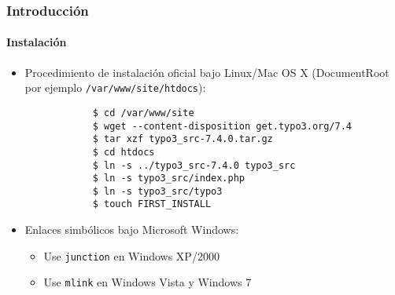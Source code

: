 \begin{frame}[fragile]
	\frametitle{Introducción}
	\framesubtitle{Instalación}

	\begin{itemize}
		\item Procedimiento de instalación oficial bajo Linux/Mac OS X\newline
			(DocumentRoot por ejemplo \texttt{/var/www/site/htdocs}):
		\begin{lstlisting}
			$ cd /var/www/site
			$ wget --content-disposition get.typo3.org/7.4
			$ tar xzf typo3_src-7.4.0.tar.gz
			$ cd htdocs
			$ ln -s ../typo3_src-7.4.0 typo3_src
			$ ln -s typo3_src/index.php
			$ ln -s typo3_src/typo3
			$ touch FIRST_INSTALL
		\end{lstlisting}

		\item Enlaces simbólicos bajo Microsoft Windows:

			\begin{itemize}
				\item Use \texttt{junction} en Windows XP/2000
				\item Use \texttt{mlink} en Windows Vista y Windows 7
			\end{itemize}

	\end{itemize}
\end{frame}

